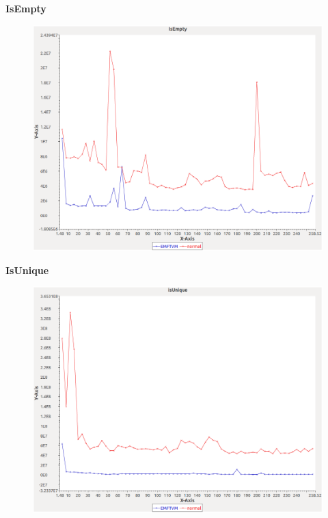 \noindent\textbf{IsEmpty}

\begin{figure}[h]
\centering
\includegraphics[width=\textwidth]{../graphs/bag/IsEmpty}
\end{figure}
\pagebreak

\noindent\textbf{IsUnique}

\begin{figure}[h]
\centering
\includegraphics[width=\textwidth]{../graphs/bag/isUnique}
\end{figure}
\pagebreak

